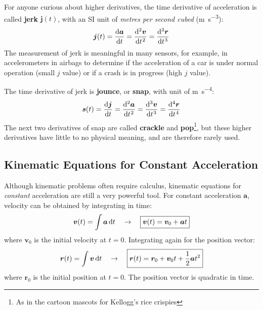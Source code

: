For anyone curious about higher derivatives, the time derivative of
acceleration is called \textbf{jerk} $\bm j(t)$, with an SI unit of
\emph{metres per second cubed} (\si{\metre\per\second\cubed}):
\begin{equation}
  \bm j(t)=\diff{\bm a}t=\diff[2]{\bm v}t=\diff[3]{\bm r}t
\end{equation}
The measurement of jerk is meaningful in many sensors, for example, in
accelerometers in airbags to determine if the acceleration of a car is under
normal operation (small $j$ value) or if a crash is in progress (high $j$
value).

The time derivative of jerk is \textbf{jounce}, or \textbf{snap}, with unit of
\si{\metre\per\second^4}:
\begin{equation}
  \bm s(t)=\diff{\bm j}t=\diff[2]{\bm a}t=\diff[3]{\bm v}t=\diff[4]{\bm r}t
\end{equation}
The next two derivatives of snap are called \textbf{crackle} and
\textbf{pop}\footnote{As in the cartoon mascots for Kellogg's rice crispies},
but these higher derivatives have little to no physical meaning, and are
therefore rarely used.



\subsection{Kinematic Equations for Constant Acceleration}

Although kinematic problems often require calculus, kinematic equations for
\emph{constant} acceleration are still a very powerful tool. For constant
acceleration $\bm a$, velocity can be obtained by integrating in time:
\begin{equation}
  \bm v(t)=\int\bm a\dl t\quad\to\quad
  \boxed{\bm v(t)=\bm v_0+\bm at}
  \label{eq:big5-1}
\end{equation}
where $\bm v_0$ is the initial velocity at $t=0$. Integrating again for the
position vector:
\begin{equation}
  \bm r(t)=\int \bm v\dl t\quad\to\quad
  \boxed{\bm r(t)=\bm r_0+\bm v_0t+\frac12 \bm at^2}
  \label{eq:big5-2}
\end{equation}
where $\bm r_0$ is the initial position at $t=0$. The position vector is
quadratic in time.

